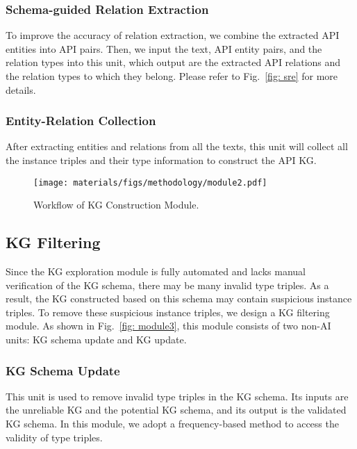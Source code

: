 \subsubsection{Schema-guided Relation Extraction}
To improve the accuracy of relation extraction, we combine the extracted API entities into API pairs.
Then, we input the text, API entity pairs, and the relation types into this unit, which output are the extracted API relations and the relation types to which they belong.
Please refer to Fig.~\ref{fig: sre} for more details.


\subsubsection{Entity-Relation Collection}
After extracting entities and relations from all the texts, this unit will collect all the instance triples and their type information to construct the API KG.

\begin{figure}[t]
    \centering
\texttt{[image: materials/figs/methodology/module2.pdf]}
    \caption{Workflow of KG Construction Module.}
    \label{fig: module2}
\end{figure}

\vspace{-2mm}
\subsection{KG Filtering}
Since the KG exploration module is fully automated and lacks manual verification of the KG schema, there may be many invalid type triples.
As a result, the KG constructed based on this schema may contain suspicious instance triples.
To remove these suspicious instance triples, we design a KG filtering module.
As shown in Fig.~\ref{fig: module3}, this module consists of two non-AI units: KG schema update and KG update.

\subsubsection{KG Schema Update}
This unit is used to remove invalid type triples in the KG schema.
Its inputs are the unreliable KG and the potential KG schema, and its output is the validated KG schema.
In this module, we adopt a frequency-based method to access the validity of type triples.

